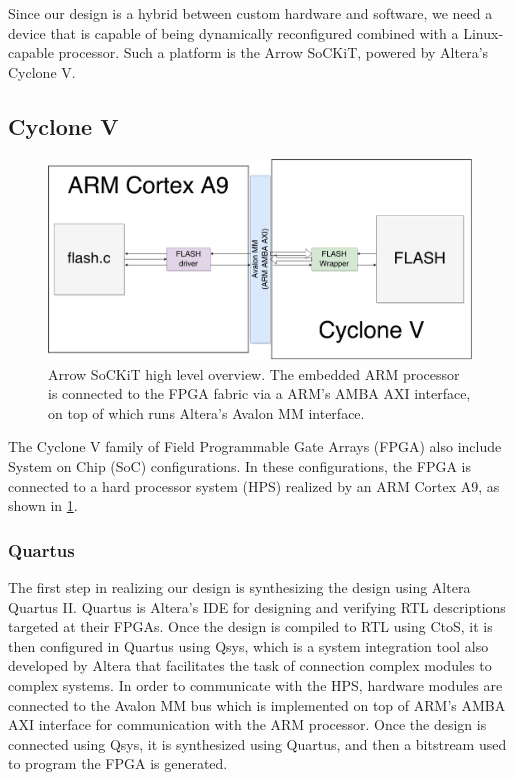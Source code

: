 \documentclass{sig-alternate-10pt}
\begin{document}
Since our design is a hybrid between custom hardware and software, we need a device that is capable of being dynamically reconfigured combined with a Linux-capable processor. Such a platform is the Arrow SoCKiT, powered by Altera's Cyclone V.

\subsection{Cyclone V}
\begin{figure}
	\begin{center}
		\includegraphics[width=0.9\linewidth]{fig/sockit-architecture.png}
		\caption{
			Arrow SoCKiT high level overview. The embedded ARM processor is connected to the FPGA fabric via a ARM's AMBA AXI interface, on top of which runs Altera's Avalon MM interface.
		}
		\label{fig:sockit_overview}
	\end{center}
\end{figure}

The Cyclone V family of Field Programmable Gate Arrays (FPGA) also include System on Chip (SoC) configurations. In these configurations, the FPGA is connected to a hard processor system (HPS) realized by an ARM Cortex A9, as shown in \ref{fig:sockit_overview}.

\subsubsection{Quartus}
The first step in realizing our design is synthesizing the design using Altera Quartus II. Quartus is Altera's IDE for designing and verifying RTL descriptions targeted at their FPGAs. Once the design is compiled to RTL using CtoS, it is then configured in Quartus using Qsys, which is a system integration tool also developed by Altera that facilitates the task of connection complex modules to complex systems. In order to communicate with the HPS, hardware modules are connected to the Avalon MM bus which is implemented on top of ARM's AMBA AXI interface for communication with the ARM processor. Once the design is connected using Qsys, it is synthesized using Quartus, and then a bitstream used to program the FPGA is generated.
\end{document}
